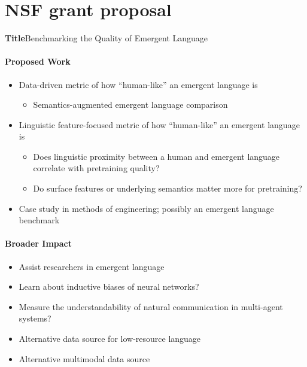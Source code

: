 \section{NSF grant proposal}

\noindent\textbf{Title}\quad Benchmarking the Quality of Emergent Language

\paragraph{Proposed Work}
\begin{itemize}
    \item Data-driven metric of how ``human-like'' an emergent language is
        \begin{itemize}
        \item Semantics-augmented emergent language comparison
        \end{itemize}
    \item Linguistic feature-focused metric of how ``human-like'' an emergent language is
        \begin{itemize}
        \item Does linguistic proximity between a human and emergent language correlate with pretraining quality?
        \item Do surface features or underlying semantics matter more for pretraining?
        \end{itemize}
    \item Case study in methods of engineering; possibly an emergent language benchmark
\end{itemize}

\paragraph{Broader Impact}
\begin{itemize}
    \item {} Assist researchers in emergent language
    \item {} Learn about inductive biases of neural networks?
    \item {} Measure the understandability of natural communication in multi-agent systems?
    \item {} Alternative data source for low-resource language
    \item {} Alternative multimodal data source
\end{itemize}
